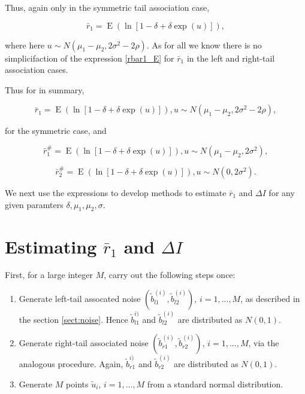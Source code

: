 \documentclass[letterpaper,11pt]{article}
\DeclareMathOperator{\EX}{E}%
\begin{document}
\noindent Thus, again only in the symmetric tail association case,

\begin{equation}
\bar r_1 = \EX(\ln[1-\delta+\delta \exp(u)]), \label{rbar1_E_usub}
\end{equation}

\noindent where here $u \sim N(\mu_1-\mu_2, 2\sigma^2-2\rho)$. 
As for all we know there is no simplicifaction of the expression \ref{rbar1_E}  for $\bar r_1$ in the left and right-tail association cases. 

Thus for in summary,

\begin{equation}
\bar r_1 = \EX(\ln[1-\delta+\delta \exp(u)]), u \sim N(\mu_1-\mu_2, 2\sigma^2-2\rho), \label{sym_rbar1}
\end{equation}

\noindent for the symmetric case, and 

\begin{equation}
\bar r_1^{\#} = \EX(\ln[1-\delta+\delta \exp(u)]), u \sim N(\mu_1-\mu_2, 2\sigma^2), \label{sym_rbar1sharp}
\end{equation}

\begin{equation}
\bar r_2^{\#} = \EX(\ln[1-\delta+\delta \exp(u)]), u \sim N(0, 2\sigma^2). \label{sym_rbar2sharp}
\end{equation}

\noindent We next use the expressions to develop methods to estimate $\bar r_1$ and $\Delta I$ for any given paramters $\delta,\mu_1,\mu_2,\sigma$.




\section{Estimating $\bar r_1$ and $\Delta I$}

First, for a large integer $M$, carry out the following steps once:

\begin{enumerate}
\item Generate left-tail assocated noise $\left(\tilde b_{l1}^{(i)}, \tilde b_{l2}^{(i)}\right)$, $i=1,...,M$, as described in the section \ref{sect:noise}. Hence $\tilde b_{l1}^{i)}$ and $\tilde b_{l2}^{(i)}$ are distributed as $N(0,1)$. 
\item Generate right-tail associated noise $\left(\tilde b_{r1}^{(i)}, \tilde b_{r2}^{(i)}\right)$, $i=1,...,M$, via the analogous procedure. Again, $\tilde b_{r1}^{i)}$ and $\tilde b_{r2}^{(i)}$ are distributed as $N(0,1)$. 
\item Generate $M$ points $\tilde u_i$, $i = 1,...,M$ from a standard normal distribution. 
\end{enumerate}
\end{document}
